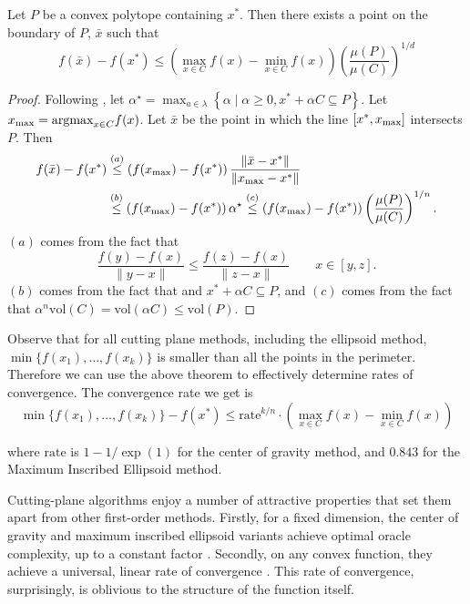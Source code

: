\begin{lem}\label{lem:lem-voldecrease} Let $P$ be a convex polytope containing $x^*$. Then there exists a point on the boundary of $P$, $\bar{x}$ such that
$$
f(\bar{x})-f(x^{*})\leq\left(\max_{x\in C}f(x)-\min_{x\in C}f(x)\right)\left(\frac{\mu(P)}{\mu(C)}\right)^{1/d}
$$
\end{lem}
\begin{proof}
Following \cite{tarasov1988method}, let
$\alpha^\star = \max_{a\in\lambda}\left\{ \alpha\mid\alpha\geq0,x^*+\alpha C\subseteq P\right\}.$ 
Let $x_{\max} = \mbox{argmax}_{x\in C} f(x)$. Let $\bar{x}$ be the point in which the line $[x^*, x_{\max} ]$ intersects $P$. Then
\begin{align*}
f(\bar{x})-f(x^{*}) & \overset{(a)}{\leq}\left(f(x_{\max})-f(x^{*})\right)\frac{\|\bar{x}-x^{*}\|}{\|x_{\max}-x^{*}\|}\\
 & \overset{(b)}{\leq}\left(f(x_{\max})-f(x^{*})\right)\alpha^\star
 \overset{(c)}{\leq}\left(f(x_{\max})-f(x^{*})\right)\left(\frac{\mu(P)}{\mu(C)}\right)^{1/n}.
\end{align*}
$(a)$ comes from the fact that $$\frac{f(y)-f(x)}{\|y-x\|}\leq\frac{f(z)-f(x)}{\|z-x\|} \qquad x \in [y,z].$$$(b)$ comes from the fact that and $x^* + \alpha C \subseteq P$, and $(c)$ comes from the fact that $\alpha^n \mbox{vol}(C) =  \mbox{vol}(\alpha C) \leq \mbox{vol}(P).$
\end{proof}


Observe that for all cutting plane methods, including the ellipsoid method, $\min\{f(x_1),\dots, f(x_k)\}$ is smaller than all the points in the perimeter. Therefore we can use the above theorem to effectively determine rates of convergence. The convergence rate we get is
$$
\min\{f(x_{1}),\dots,f(x_{k})\}-f(x^{*})\leq \mbox{rate}^{k/n}\cdot\left(\max_{x\in C}f(x)-\min_{x\in C}f(x)\right)
$$

where $\mbox{rate}$ is $1 - 1/\exp(1)$ for the center of gravity method, and
$0.843$ for the Maximum Inscribed Ellipsoid method.

Cutting-plane algorithms enjoy a number of attractive properties that
set them apart from other first-order methods.  Firstly, for a fixed
dimension, the center of gravity and maximum inscribed ellipsoid
variants achieve optimal oracle complexity, up to a constant factor
\cite{nemirovski1994efficient}. Secondly, on any convex function, they
achieve a universal, linear rate of convergence
\cite{nemirovski1994efficient}. This rate of convergence,
surprisingly, is oblivious to the structure of the function itself.

